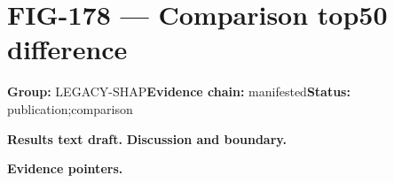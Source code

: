 \clearpage
\section{FIG-178 --- Comparison top50 difference}
\label{figpage:fig-178}
\textbf{Group:} LEGACY-SHAP\quad \textbf{Evidence chain:} manifested\quad \textbf{Status:} publication;comparison

\textbf{Results text draft.} 
\textbf{Discussion and boundary.} 


\textbf{Evidence pointers.}



\vfill
